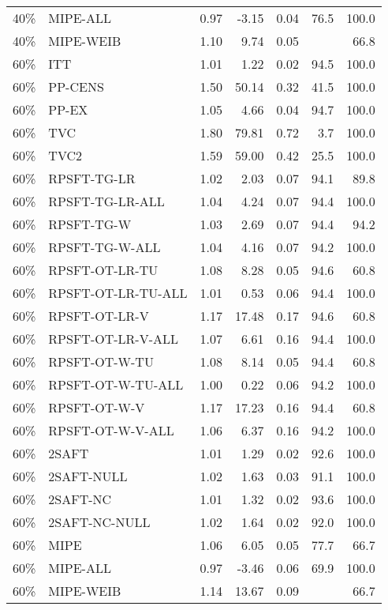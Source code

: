 \begin{table}[ht]
{\begin{tabular}{llrrrrr}
  40\% & MIPE-ALL & 0.97 & -3.15 & 0.04 & 76.5 & 100.0 \\ 
  40\% & MIPE-WEIB & 1.10 & 9.74 & 0.05 &  & 66.8 \\ 
   \hline
60\% & ITT & 1.01 & 1.22 & 0.02 & 94.5 & 100.0 \\ 
  60\% & PP-CENS & 1.50 & 50.14 & 0.32 & 41.5 & 100.0 \\ 
  60\% & PP-EX & 1.05 & 4.66 & 0.04 & 94.7 & 100.0 \\ 
  60\% & TVC & 1.80 & 79.81 & 0.72 & 3.7 & 100.0 \\ 
  60\% & TVC2 & 1.59 & 59.00 & 0.42 & 25.5 & 100.0 \\ 
   \hline
60\% & RPSFT-TG-LR & 1.02 & 2.03 & 0.07 & 94.1 & 89.8 \\ 
  60\% & RPSFT-TG-LR-ALL & 1.04 & 4.24 & 0.07 & 94.4 & 100.0 \\ 
  60\% & RPSFT-TG-W & 1.03 & 2.69 & 0.07 & 94.4 & 94.2 \\ 
  60\% & RPSFT-TG-W-ALL & 1.04 & 4.16 & 0.07 & 94.2 & 100.0 \\ 
  60\% & RPSFT-OT-LR-TU & 1.08 & 8.28 & 0.05 & 94.6 & 60.8 \\ 
  60\% & RPSFT-OT-LR-TU-ALL & 1.01 & 0.53 & 0.06 & 94.4 & 100.0 \\ 
  60\% & RPSFT-OT-LR-V & 1.17 & 17.48 & 0.17 & 94.6 & 60.8 \\ 
  60\% & RPSFT-OT-LR-V-ALL & 1.07 & 6.61 & 0.16 & 94.4 & 100.0 \\ 
   \hline
60\% & RPSFT-OT-W-TU & 1.08 & 8.14 & 0.05 & 94.4 & 60.8 \\ 
  60\% & RPSFT-OT-W-TU-ALL & 1.00 & 0.22 & 0.06 & 94.2 & 100.0 \\ 
  60\% & RPSFT-OT-W-V & 1.17 & 17.23 & 0.16 & 94.4 & 60.8 \\ 
  60\% & RPSFT-OT-W-V-ALL & 1.06 & 6.37 & 0.16 & 94.2 & 100.0 \\ 
   \hline
60\% & 2SAFT & 1.01 & 1.29 & 0.02 & 92.6 & 100.0 \\ 
  60\% & 2SAFT-NULL & 1.02 & 1.63 & 0.03 & 91.1 & 100.0 \\ 
  60\% & 2SAFT-NC & 1.01 & 1.32 & 0.02 & 93.6 & 100.0 \\ 
  60\% & 2SAFT-NC-NULL & 1.02 & 1.64 & 0.02 & 92.0 & 100.0 \\ 
  60\% & MIPE & 1.06 & 6.05 & 0.05 & 77.7 & 66.7 \\ 
  60\% & MIPE-ALL & 0.97 & -3.46 & 0.06 & 69.9 & 100.0 \\ 
  60\% & MIPE-WEIB & 1.14 & 13.67 & 0.09 &  & 66.7 \\ 
   \hline
\end{tabular}
}
\end{table}
\clearpage
